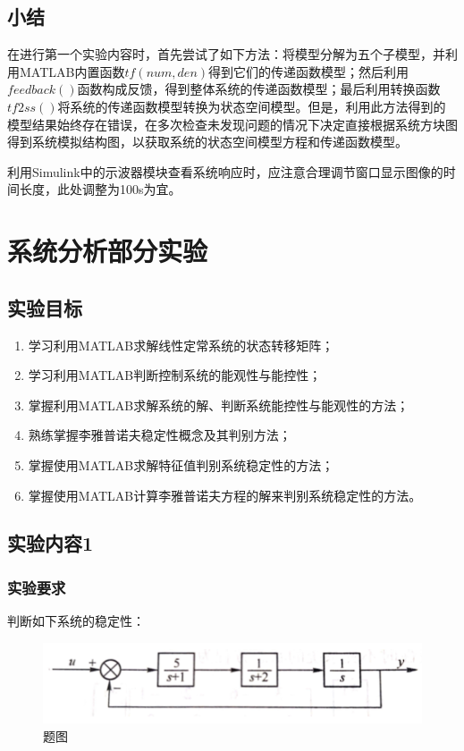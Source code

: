 \documentclass[UTF8]{article}
\begin{document}
\subsection{小结}
在进行第一个实验内容时，首先尝试了如下方法：将模型分解为五个子模型，并利用MATLAB内置函数$tf(num, den)$得到它们的传递函数模型；然后利用$feedback()$函数构成反馈，得到整体系统的传递函数模型；最后利用转换函数$tf2ss()$将系统的传递函数模型转换为状态空间模型。但是，利用此方法得到的模型结果始终存在错误，在多次检查未发现问题的情况下决定直接根据系统方块图得到系统模拟结构图，以获取系统的状态空间模型方程和传递函数模型。

利用Simulink中的示波器模块查看系统响应时，应注意合理调节窗口显示图像的时间长度，此处调整为100s为宜。


\section{系统分析部分实验}
\subsection{实验目标}

\begin{enumerate}
    \item 学习利用MATLAB求解线性定常系统的状态转移矩阵；
    \item 学习利用MATLAB判断控制系统的能观性与能控性；
    \item 掌握利用MATLAB求解系统的解、判断系统能控性与能观性的方法；
    \item 熟练掌握李雅普诺夫稳定性概念及其判别方法；
    \item 掌握使用MATLAB求解特征值判别系统稳定性的方法；
    \item 掌握使用MATLAB计算李雅普诺夫方程的解来判别系统稳定性的方法。
\end{enumerate}

\subsection{实验内容1}
\subsubsection{实验要求}
判断如下系统的稳定性：
\begin{figure}[H]
    \centering %
    \includegraphics[width=.8\textwidth]{figure/exp2_1.png} 
    \caption{题图} %
\end{figure}
\end{document}
